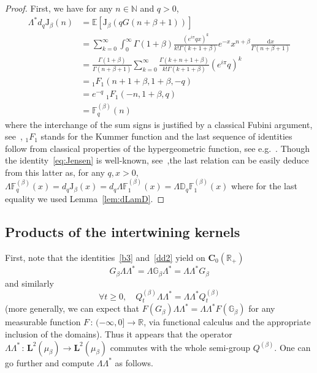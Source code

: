 \documentclass[10pt]{amsart}
\theoremstyle{definition}\newtheorem{defi}[theo]{Definition}\newtheorem{rema}[theo]{Remark}\newtheorem{exam}[theo]{Example}\newtheorem{exem}[theo]{Example}\newtheorem{nota}[theo]{Notation}
\newcommand{\RR}{\mathbb{R}}
\newcommand{\iy}{\infty}
\newcommand{\ri}{\rightarrow}
\newcommand{\st}{\,:\,}
\newcommand{\dBg}{{\discret{G}}}
\newcommand{\Bg}{G}
\newcommand{\Bs}{Q}
\newcommand{\esL}{\mathbf{L}}
\newcommand{\esC}{\mathbf{C}}
\newcommand{\Jg}{{\mathrm{J}}_{\beta}}
\newcommand*\E{{\mathbb E}}
\newcommand*\N{{\mathbb N}}
\newcommand{\discret}[1]{\mathds{#1}}
\newcommand{\cont}[1]{{#1}}
\newcommand{\adjL}{\Lambda^*}
\newcommand*{\MK}{\mkern 2mu}
\let\oldforall\forall
\renewcommand*{\forall}{\mathrel{\oldforall}}
\newcommand*{\dd}{\mathrm{d}}
\newcommand*{\dx}{\dd x}
\begin{document}
\begin{proof}
First, we have for any $n\in \N$ and $q>0$,
\begin{align*}
\Lambda^* d_q \Jg(n) &= \E\left[\Jg(q G(n+\beta+1))\right]\\&=
\sum_{k=0}^{\infty}\int_0^{\infty}\Gamma(1+\beta)\frac{(e^{i\pi}qx)^k}{k!\Gamma(k+1+\beta)}e^{-x}x^{n+\beta}\frac{\dx}{\Gamma(n+\beta+1)}\\
&=\frac{\Gamma(1+\beta)}{\Gamma(n+\beta+1)} \sum_{k=0}^{\infty}\frac{\Gamma(k+n+1+\beta)}{k!\Gamma(k+1+\beta)}(e^{i\pi}q)^k \\
&= {}_{1}F_{1}(n+1+\beta,1+\beta,-q)\\
&= e^{-q}\; {}_{1}F_{1}(-n,1+\beta,q)\\
&= \mathbb{F}^{(\beta)}_q(n)
\end{align*}
where the interchange of the sum signs is justified by a classical Fubini argument, see~\cite{Titchmarsh39}, $ {}_{1}F_{1}$ stands for the Kummer function and the last sequence of identities follow from classical properties of the hypergeometric function, see e.g.~\cite{Koekoek2010}. Though the identity~\eqref{eq:Jensen} is well-known, see~\cite[Proposition~2.1$\MK$(ii)]{Craven1989},\linebreak the last relation can be easily deduce from this latter as, for any $q,x>0$, \linebreak$\Lambda \mathbb{F}^{(\beta)}_q(x)=\cont{d}_q\Jg(x)=\cont{d}_q\Lambda \mathbb{F}^{(\beta)}_1(x)=\Lambda \discret{D}_q\mathbb{F}^{(\beta)}_1(x)$ where for the last equality we used Lemma~\ref{lem:dLamD}.
\end{proof}

\subsection{Products of the intertwining kernels}

First, note that the identities~\eqref{b3} and~\eqref{dd2} yield on $\esC_0(\RR_+)$
\[
\Bg_{\beta}\Lambda\adjL =\Lambda \dBg_{\beta} \adjL =\Lambda\adjL \Bg_{\beta}
\]
and similarly
\[
\forall t\geq 0,\quad
\Bs^{(\beta)}_t\Lambda\adjL =\Lambda\adjL \Bs_t^{(\beta)}
\]
(more generally, we can expect that $F(\Bg_{\beta})\Lambda\adjL =\Lambda\adjL F(\dBg_{\beta})$ for any measurable function $F\st (-\iy,0]\ri\RR$, via functional calculus and the appropriate inclusion of the domains). Thus it appears that the operator $\Lambda\adjL \st \esL^2(\mu_{\beta})\ri\esL^2(\mu_{\beta})$ commutes with the whole semi-group $\Bs^{(\beta)}$. One can go further and compute $\Lambda\adjL $ as follows.
\end{document}
